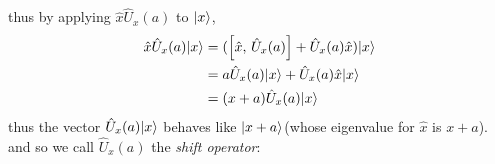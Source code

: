 thus by applying $\hat{x} \hat{U}_x(a)$ to $\lvert x\rangle$,
\begin{align}
  \hat{x} \hat{U}_x(a) \lvert x\rangle
   & = (\left\lbrack \hat{x} ,\, \hat{U}_x(a) \right\rbrack + \hat{U}_x(a) \hat{x}) \lvert x\rangle \\
   & = a \hat{U}_x(a) \lvert x\rangle + \hat{U}_x(a) \hat{x} \lvert x\rangle          \\
   & = (x + a) \hat{U}_x(a)\lvert x\rangle
\end{align}
thus the vector $\hat{U}_x(a) \lvert x\rangle$ behaves like $\lvert x + a\rangle$(whose eigenvalue for $\hat{x}$ is $x + a$).
and so we call $\hat{U}_x(a)$ the \emph{shift operator}:

